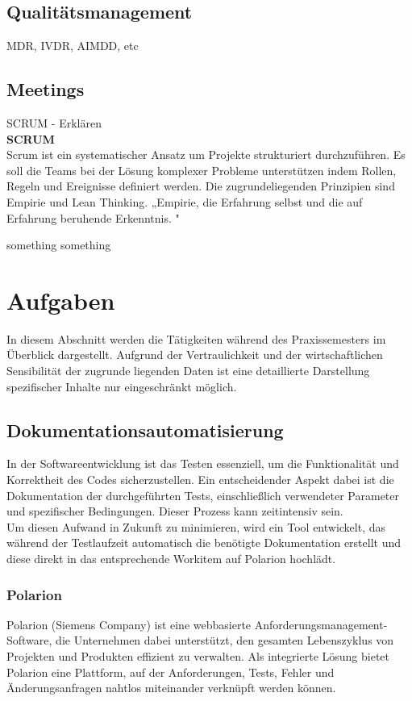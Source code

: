 \documentclass[a4paper, 12pt]{article}
\begin{document}
\newpage
\subsection{Qualitätsmanagement}\label{Qualitätsmanagement}
MDR, IVDR, AIMDD, etc

\subsection{Meetings}\label{Meetings}
SCRUM - Erklären
\\ 
\textbf{SCRUM}\\
Scrum ist ein systematischer Ansatz um Projekte strukturiert durchzuführen. Es soll die Teams bei der Lösung komplexer Probleme unterstützen indem Rollen, Regeln und Ereignisse definiert werden. Die zugrundeliegenden Prinzipien sind Empirie und Lean Thinking. 
„Empirie, die Erfahrung selbst und die auf Erfahrung beruhende Erkenntnis.  
 \cite{dorsch_empirie}" 

something something 
\cite{scrum2020}

\newpage
\section{Aufgaben}\label{Aufgaben}
In diesem Abschnitt werden die Tätigkeiten während des Praxissemesters im Überblick dargestellt. Aufgrund der Vertraulichkeit und der wirtschaftlichen Sensibilität der zugrunde liegenden Daten ist eine detaillierte Darstellung spezifischer Inhalte nur eingeschränkt möglich.

\subsection{Dokumentationsautomatisierung}\label{Dokumentationsautomatisierung}
In der Softwareentwicklung ist das Testen essenziell, um die Funktionalität und Korrektheit des Codes sicherzustellen. Ein entscheidender Aspekt dabei ist die Dokumentation der durchgeführten Tests, einschließlich verwendeter Parameter und spezifischer Bedingungen. Dieser Prozess kann zeitintensiv sein. \\
Um diesen Aufwand in Zukunft zu minimieren, wird ein Tool entwickelt, das während der Testlaufzeit automatisch die benötigte Dokumentation erstellt und diese direkt in das entsprechende Workitem auf Polarion hochlädt.

\subsubsection{Polarion}\label{polarion}
Polarion (Siemens Company) ist eine webbasierte Anforderungsmanagement-Software, die Unternehmen dabei unterstützt, den gesamten Lebenszyklus von Projekten und Produkten effizient zu verwalten. Als integrierte Lösung bietet Polarion eine Plattform, auf der Anforderungen, Tests, Fehler und Änderungsanfragen nahtlos miteinander verknüpft werden können.
\end{document}
